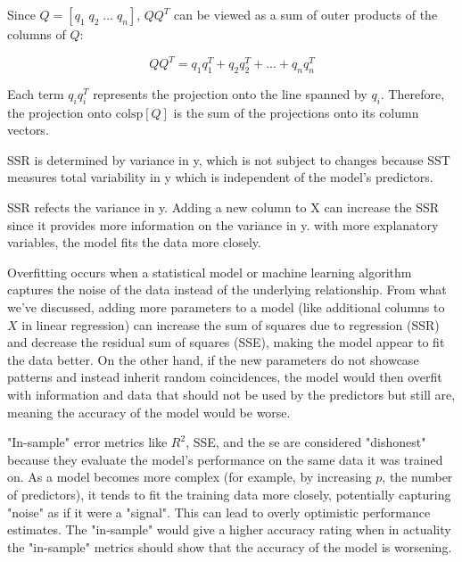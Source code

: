 \documentclass[12pt]{article}
\begin{document}
\begin{enumerate}
Since \(Q = [q_1 \; q_2 \; ... \; q_n]\), \(QQ^T\) can be viewed as a sum of outer products of the columns of \(Q\):

\[QQ^T = q_1q_1^T + q_2q_2^T + ... + q_nq_n^T\]

Each term \(q_iq_i^T\) represents the projection onto the line spanned by \(q_i\). Therefore, the projection onto \(\text{colsp}[Q]\) is the sum of the projections onto its column vectors.


SSR is determined by variance in y, which is not subject to changes because SST measures total variability in y which is independent of the model's predictors.


SSR refects the variance in y. Adding a new column to X can increase the SSR since it provides more information on the variance in y. with more explanatory variables, the model fits the data more closely.


Overfitting occurs when a statistical model or machine learning algorithm captures the noise of the data instead of the underlying relationship. From what we've discussed, adding more parameters to a model (like additional columns to \(X\) in linear regression) can increase the sum of squares due to regression (SSR) and decrease the residual sum of squares (SSE), making the model appear to fit the data better. On the other hand, if the new parameters do not showcase patterns and instead inherit random coincidences, the model would then overfit with information and data that should not be used by the predictors but still are, meaning the accuracy of the model would be worse.


"In-sample" error metrics like \(R^2\), SSE, and the se are considered "dishonest" because they evaluate the model's performance on the same data it was trained on. As a model becomes more complex (for example, by increasing \(p\), the number of predictors), it tends to fit the training data more closely, potentially capturing "noise" as if it were a "signal". This can lead to overly optimistic performance estimates. The "in-sample" would give a higher accuracy rating when in actuality the "in-sample" metrics should show that the accuracy of the model is worsening.


\end{enumerate}
\end{document}
